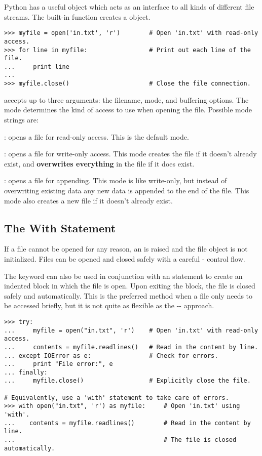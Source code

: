 Python has a useful  object which acts as an interface to all kinds of different file streams.
The built-in function  creates a  object.

\begin{lstlisting}
>>> myfile = open('in.txt', 'r')        # Open 'in.txt' with read-only access.
>>> for line in myfile:                 # Print out each line of the file.
...     print line
...
>>> myfile.close()                      # Close the file connection.
\end{lstlisting}

 accepts up to three arguments: the filename, mode, and buffering options.
The mode determines the kind of access to use when opening the file.
Possible mode strings are:
\begin{description}
\item {}: opens a file for read-only access.
This is the default mode.
\item {}: opens a file for write-only access.
This mode creates the file if it doesn't already exist, and \textbf{overwrites everything} in the file if it does exist.
\item {}: opens a file for appending.
This mode is like write-only, but instead of overwriting existing data any new data is appended to the end of the file.
This mode also creates a new file if it doesn't already exist.
\end{description}

\subsection*{The With Statement} %

If a file cannot be opened for any reason, an  is raised and the file object is not initialized.
Files can be opened and closed safely with a careful - control flow.

The keyword  can also be used in conjunction with an  statement to create an indented block in which the file is open.
Upon exiting the block, the file is closed safely and automatically.
This is the preferred method when a file only needs to be accessed briefly, but it is not quite as flexible as the -- approach.

\begin{lstlisting}
>>> try:
...     myfile = open("in.txt", 'r')    # Open 'in.txt' with read-only access.
...     contents = myfile.readlines()   # Read in the content by line.
... except IOError as e:                # Check for errors.
...     print "File error:", e
... finally:
...     myfile.close()                  # Explicitly close the file.

# Equivalently, use a 'with' statement to take care of errors.
>>> with open("in.txt", 'r') as myfile:     # Open 'in.txt' using 'with'.
...    contents = myfile.readlines()        # Read in the content by line.
...                                         # The file is closed automatically.
\end{lstlisting}

